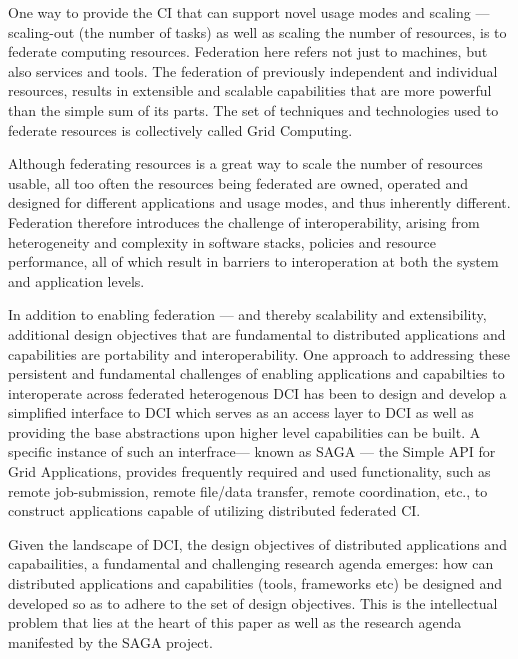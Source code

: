 \documentclass[a4paper,12pt]{article}
\begin{document}
One way to provide the CI that can support novel usage modes and
scaling --- scaling-out (the number of tasks) as well as scaling the
number of resources, is to federate computing resources.  Federation
here refers not just to machines, but also services and tools.  The
federation of previously independent and individual resources, results
in extensible and scalable capabilities that are more powerful than
the simple sum of its parts.  The set of techniques and technologies
used to federate resources is collectively called Grid Computing.

Although federating resources is a great way to scale the number of
resources usable, all too often the resources being federated are
owned, operated and designed for different applications and usage
modes, and thus inherently different. Federation therefore introduces
the challenge of interoperability, arising from heterogeneity and
complexity in software stacks, policies and resource performance, all
of which result in barriers to interoperation at both the system and
application levels.

In addition to enabling federation --- and thereby scalability and
extensibility, additional design objectives that are fundamental to
distributed applications and capabilities are portability and
interoperability.  One approach to addressing these persistent and
fundamental challenges of enabling applications and capabilties to
interoperate across federated heterogenous DCI has been to design and
develop a simplified interface to DCI which serves as an access layer
to DCI as well as providing the base abstractions upon higher level
capabilities can be built. A specific instance of such an
interfrace--- known as SAGA --- the Simple API for Grid Applications,
provides frequently required and used functionality, such as remote
job-submission, remote file/data transfer, remote coordination, etc.,
to construct applications capable of utilizing distributed federated
CI.

Given the landscape of DCI, the design objectives of distributed
applications and capabailities, a fundamental and challenging research
agenda emerges: how can distributed applications and capabilities
(tools, frameworks etc) be designed and developed so as to adhere to
the set of design objectives.  This is the intellectual problem that
lies at the heart of this paper as well as the research agenda
manifested by the SAGA project.


\end{document}
